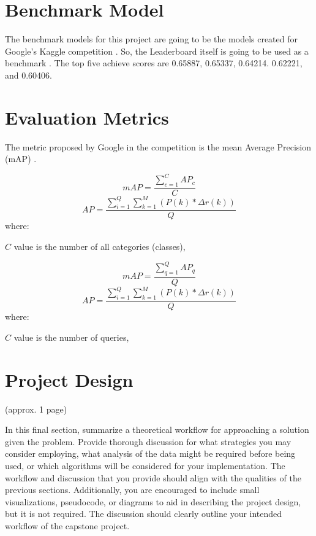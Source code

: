 \documentclass[11pt]{article}
\begin{document}
\section{Benchmark Model}

The benchmark models for this project are going to be the models created for Google's Kaggle competition \cite{kaggle}. So, the Leaderboard itself is going to be used as a benchmark \cite{leaderboard}. The top five achieve scores are 0.65887, 0.65337, 0.64214. 0.62221, and 0.60406.

\section{Evaluation Metrics}

The metric proposed by Google in the competition is the mean Average Precision (mAP) \cite{map}.


{\centering
	\begin{equation*}
	mAP = \frac{\sum\limits_{c=1}^{C}AP_c} {C}
	\end{equation*}
	\begin{equation*}
	AP = \frac{\sum\limits_{i=1}^{Q}\sum\limits_{k=1}^{M}(P(k)*\Delta r(k))} {Q}
	\end{equation*}}
where:

$C$ value is the number of all categories (classes),



{\centering
\begin{equation*}
mAP = \frac{\sum\limits_{q=1}^{Q}AP_q} {Q}
\end{equation*}
\begin{equation*}
AP = \frac{\sum\limits_{i=1}^{Q}\sum\limits_{k=1}^{M}(P(k)*\Delta r(k))} {Q}
\end{equation*}}
where:

$C$ value is the number of queries,

	


\section{Project Design}

(approx. 1 page)

In this final section, summarize a theoretical workflow for approaching a solution given the problem. Provide thorough discussion for what strategies you may consider employing, what analysis of the data might be required before being used, or which algorithms will be considered for your implementation. The workflow and discussion that you provide should align with the qualities of the previous sections. Additionally, you are encouraged to include small visualizations, pseudocode, or diagrams to aid in describing the project design, but it is not required. The discussion should clearly outline your intended workflow of the capstone project.


{}
\end{document}
